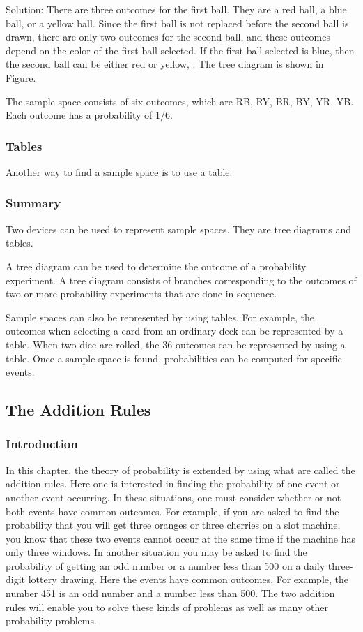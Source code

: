 Solution: There are three outcomes for the first ball. They are a red ball, a blue ball, or a yellow ball. Since the first ball is not replaced before the second ball is drawn, there are only two outcomes for the second ball, and these outcomes depend on the color of the first ball selected. If the first ball selected is blue, then the second ball can be either red or yellow, \etc. The tree diagram is shown in Figure.

The sample space consists of six outcomes, which are RB, RY, BR, BY, YR, YB. Each outcome has a probability of $1/6$.


\subsubsection{Tables}
Another way to find a sample space is to use a table.


\subsubsection{Summary}
Two devices can be used to represent sample spaces. They are tree diagrams and tables.

A tree diagram can be used to determine the outcome of a probability experiment. A tree diagram consists of branches corresponding to the outcomes of two or more probability experiments that are done in sequence.

Sample spaces can also be represented by using tables. For example, the outcomes when selecting a card from an ordinary deck can be represented by a table. When two dice are rolled, the 36 outcomes can be represented by using a table. Once a sample space is found, probabilities can be computed for specific events.


\subsection{The Addition Rules} 


\subsubsection{Introduction}
In this chapter, the theory of probability is extended by using what are called the addition rules. Here one is interested in finding the probability of one event or another event occurring. In these situations, one must consider whether or not both events have common outcomes. For example, if you are asked to find the probability that you will get three oranges or three cherries on a slot machine, you know that these two events cannot occur at the same time if the machine has only three windows. In another situation you may be asked to find the probability of getting an odd number or a number less than 500 on a daily three-digit lottery drawing. Here the events have common outcomes. For example, the number 451 is an odd number and a number less than 500. The two addition rules will enable you to solve these kinds of problems as well as many other probability problems.


